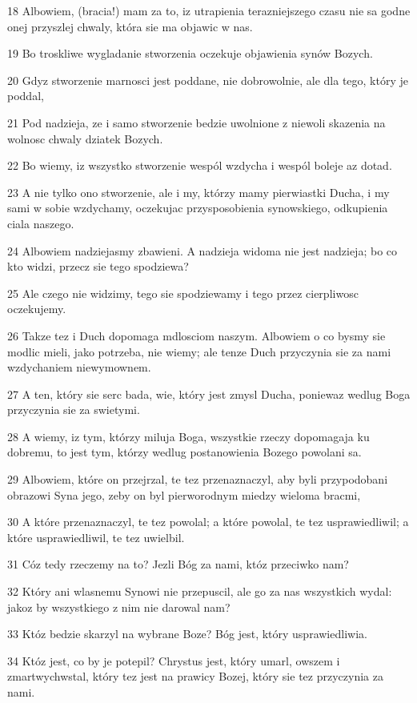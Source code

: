 \par 18 Albowiem, (bracia!) mam za to, iz utrapienia terazniejszego czasu nie sa godne onej przyszlej chwaly, która sie ma objawic w nas.
\par 19 Bo troskliwe wygladanie stworzenia oczekuje objawienia synów Bozych.
\par 20 Gdyz stworzenie marnosci jest poddane, nie dobrowolnie, ale dla tego, który je poddal,
\par 21 Pod nadzieja, ze i samo stworzenie bedzie uwolnione z niewoli skazenia na wolnosc chwaly dziatek Bozych.
\par 22 Bo wiemy, iz wszystko stworzenie wespól wzdycha i wespól boleje az dotad.
\par 23 A nie tylko ono stworzenie, ale i my, którzy mamy pierwiastki Ducha, i my sami w sobie wzdychamy, oczekujac przysposobienia synowskiego, odkupienia ciala naszego.
\par 24 Albowiem nadziejasmy zbawieni. A nadzieja widoma nie jest nadzieja; bo co kto widzi, przecz sie tego spodziewa?
\par 25 Ale czego nie widzimy, tego sie spodziewamy i tego przez cierpliwosc oczekujemy.
\par 26 Takze tez i Duch dopomaga mdlosciom naszym. Albowiem o co bysmy sie modlic mieli, jako potrzeba, nie wiemy; ale tenze Duch przyczynia sie za nami wzdychaniem niewymownem.
\par 27 A ten, który sie serc bada, wie, który jest zmysl Ducha, poniewaz wedlug Boga przyczynia sie za swietymi.
\par 28 A wiemy, iz tym, którzy miluja Boga, wszystkie rzeczy dopomagaja ku dobremu, to jest tym, którzy wedlug postanowienia Bozego powolani sa.
\par 29 Albowiem, które on przejrzal, te tez przenaznaczyl, aby byli przypodobani obrazowi Syna jego, zeby on byl pierworodnym miedzy wieloma bracmi,
\par 30 A które przenaznaczyl, te tez powolal; a które powolal, te tez usprawiedliwil; a które usprawiedliwil, te tez uwielbil.
\par 31 Cóz tedy rzeczemy na to? Jezli Bóg za nami, któz przeciwko nam?
\par 32 Który ani wlasnemu Synowi nie przepuscil, ale go za nas wszystkich wydal: jakoz by wszystkiego z nim nie darowal nam?
\par 33 Któz bedzie skarzyl na wybrane Boze? Bóg jest, który usprawiedliwia.
\par 34 Któz jest, co by je potepil? Chrystus jest, który umarl, owszem i zmartwychwstal, który tez jest na prawicy Bozej, który sie tez przyczynia za nami.

